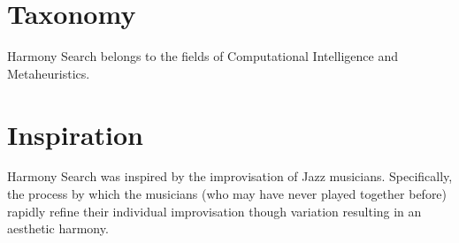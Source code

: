 \documentclass[a4paper, 11pt]{article}
\begin{document}
\section{Taxonomy}
\label{sec:taxonomy}
Harmony Search belongs to the fields of Computational Intelligence and Metaheuristics.

\section{Inspiration}
\label{sec:inspiration}
Harmony Search was inspired by the improvisation of Jazz musicians. Specifically, the process by which the musicians (who may have never played together before) rapidly refine their individual improvisation though variation resulting in an aesthetic harmony.  

\end{document}
